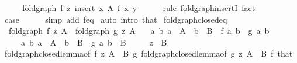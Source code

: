 \begin{isabellebody}
\ \ \isamarkupfalse%
\ \isamarkupfalse%
\ {\isachardoublequoteopen}fold{\isacharunderscore}{\kern0pt}graph\ f\ z\ {\isacharparenleft}{\kern0pt}insert\ x\ A{\isacharparenright}{\kern0pt}\ {\isacharparenleft}{\kern0pt}f\ x\ y{\isacharparenright}{\kern0pt}{\isachardoublequoteclose}\isanewline
\ \ \ \ \isamarkupfalse%
\ {\isacharparenleft}{\kern0pt}rule\ fold{\isacharunderscore}{\kern0pt}graph{\isachardot}{\kern0pt}insertI{\isacharsemicolon}{\kern0pt}\ fact{\isacharparenright}{\kern0pt}\isanewline
\ \ \isamarkupfalse%
\isanewline
\ \ \isamarkupfalse%
\ {\isacharquery}{\kern0pt}case\isanewline
\ \ \ \ \isamarkupfalse%
\ {\isacharparenleft}{\kern0pt}simp\ add{\isacharcolon}{\kern0pt}\ f{\isacharunderscore}{\kern0pt}eq{\isacharparenright}{\kern0pt}\isanewline
{}\isamarkupfalse%
\ {\isacharparenleft}{\kern0pt}auto\ intro{\isacharbang}{\kern0pt}{\isacharcolon}{\kern0pt}\ that{\isacharparenright}{\kern0pt}%
\endisatagproof
{\isafoldproof}%
%
\isadelimproof
\isanewline
%
\endisadelimproof
\isanewline
{}\isamarkupfalse%
\ fold{\isacharunderscore}{\kern0pt}graph{\isacharunderscore}{\kern0pt}closed{\isacharunderscore}{\kern0pt}eq{\isacharcolon}{\kern0pt}\isanewline
\ \ {\isachardoublequoteopen}fold{\isacharunderscore}{\kern0pt}graph\ f\ z\ A\ {\isacharequal}{\kern0pt}\ fold{\isacharunderscore}{\kern0pt}graph\ g\ z\ A{\isachardoublequoteclose}\isanewline
\ \ \ {\isachardoublequoteopen}{\isasymAnd}a\ b{\isachardot}{\kern0pt}\ a\ {\isasymin}\ A\ {\isasymLongrightarrow}\ b\ {\isasymin}\ B\ {\isasymLongrightarrow}\ f\ a\ b\ {\isacharequal}{\kern0pt}\ g\ a\ b{\isachardoublequoteclose}\isanewline
\ \ \ \ \ {\isachardoublequoteopen}{\isasymAnd}a\ b{\isachardot}{\kern0pt}\ a\ {\isasymin}\ A\ {\isasymLongrightarrow}\ b\ {\isasymin}\ B\ {\isasymLongrightarrow}\ g\ a\ b\ {\isasymin}\ B{\isachardoublequoteclose}\isanewline
\ \ \ \ \ {\isachardoublequoteopen}z\ {\isasymin}\ B{\isachardoublequoteclose}\isanewline
%
\isadelimproof
\ \ %
\endisadelimproof
%
\isatagproof
{}\isamarkupfalse%
\ fold{\isacharunderscore}{\kern0pt}graph{\isacharunderscore}{\kern0pt}closed{\isacharunderscore}{\kern0pt}lemma{\isacharbrackleft}{\kern0pt}of\ f\ z\ A\ {\isacharunderscore}{\kern0pt}\ B\ g{\isacharbrackright}{\kern0pt}\ fold{\isacharunderscore}{\kern0pt}graph{\isacharunderscore}{\kern0pt}closed{\isacharunderscore}{\kern0pt}lemma{\isacharbrackleft}{\kern0pt}of\ g\ z\ A\ {\isacharunderscore}{\kern0pt}\ B\ f{\isacharbrackright}{\kern0pt}\ that\isanewline

\end{isabellebody}
